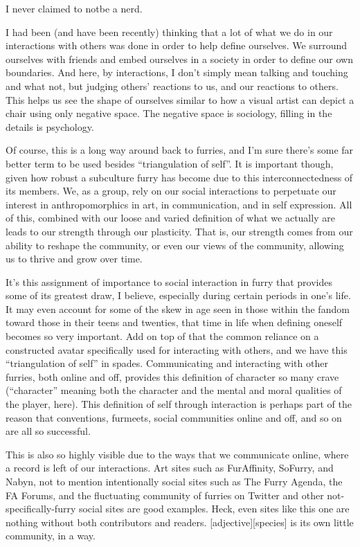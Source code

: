 I never claimed to notbe a nerd.

I had been (and have been recently) thinking that a lot of what we do in our interactions with others was done in order to help define ourselves. We surround ourselves with friends and embed ourselves in a society in order to define our own boundaries. And here, by interactions, I don't simply mean talking and touching and what not, but judging others' reactions to us, and our reactions to others. This helps us see the shape of ourselves similar to how a visual artist can depict a chair using only negative space. The negative space is sociology, filling in the details is psychology.

Of course, this is a long way around back to furries, and I'm sure there's some far better term to be used besides ``triangulation of self''. It is important though, given how robust a subculture furry has become due to this interconnectedness of its members. We, as a group, rely on our social interactions to perpetuate our interest in anthropomorphics in art, in communication, and in self expression. All of this, combined with our loose and varied definition of what we actually are leads to our strength through our plasticity. That is, our strength comes from our ability to reshape the community, or even our views of the community, allowing us to thrive and grow over time.

It's this assignment of importance to social interaction in furry that provides some of its greatest draw, I believe, especially during certain periods in one's life. It may even account for some of the skew in age seen in those within the fandom toward those in their teens and twenties, that time in life when defining oneself becomes so very important. Add on top of that the common reliance on a constructed avatar specifically used for interacting with others, and we have this ``triangulation of self'' in spades. Communicating and interacting with other furries, both online and off, provides this definition of character so many crave (``character'' meaning both the character and the mental and moral qualities of the player, here). This definition of self through interaction is perhaps part of the reason that conventions, furmeets, social communities online and off, and so on are all so successful.

This is also so highly visible due to the ways that we communicate online, where a record is left of our interactions. Art sites such as FurAffinity, SoFurry, and Nabyn, not to mention intentionally social sites such as The Furry Agenda, the FA Forums, and the fluctuating community of furries on Twitter and other not-specifically-furry social sites are good examples. Heck, even sites like this one are nothing without both contributors and readers. {[}adjective{]}{[}species{]} is its own little community, in a way.

